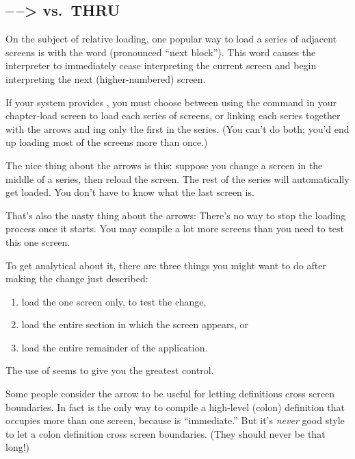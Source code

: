 \subsection{--\,--> vs.\ THRU}%

%
On the subject of relative loading, one popular way to load a series
of adjacent screens is with the word \forth{-{}->} (pronounced ``next
block'').  This word causes the interpreter to immediately cease
interpreting the current screen and begin interpreting the next
(higher-numbered) screen.

If your system provides \forth{-{}->}, you must choose between using
the  command in your chapter-load screen to load each
series of screens, or linking each series together with the arrows and
ing only the first in the series.  (You can't do both;
you'd end up loading most of the screens more than once.)%

The nice thing about the arrows is this: suppose you change a screen
in the middle of a series, then reload the screen.  The rest of the
series will automatically get loaded.  You don't have to know what the
last screen is.

That's also the nasty thing about the arrows: There's no way to stop
the loading process once it starts.  You may compile a lot more
screens than you need to test this one screen.%

To get analytical about it, there are three things you might want to
do after making the change just described:

\begin{enumerate}
\item load the one screen only, to test the change,
\item load the entire section in which the screen appears,
or
\item load the entire remainder of the application.
\end{enumerate}
The use of  seems to give you the greatest control.

Some people consider the arrow to be useful for letting definitions
cross screen boundaries.  In fact \forth{-{}->} is the only way to
compile a high-level (colon) definition that occupies more than one
screen, because \forth{-{}->} is ``immediate.'' But it's \emph{never}
good style to let a colon definition cross screen boundaries.  (They
should never be that long!)

